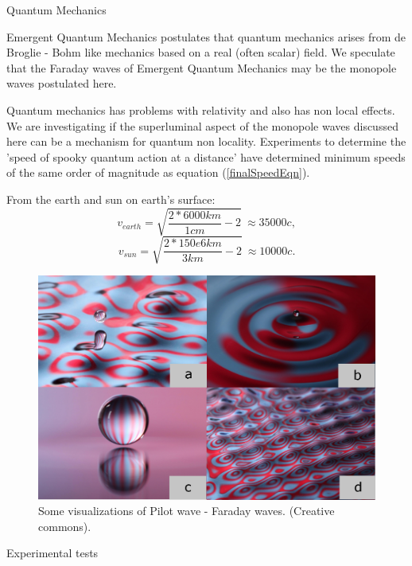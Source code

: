 \documentclass[final]{beamer}
\newlength{\colwidth}
\begin{document}
\begin{frame}[t]
\begin{columns}[t]
\begin{column}{\colwidth}
  \begin{block}{Quantum Mechanics}
  
  Emergent Quantum Mechanics postulates that quantum mechanics arises from de Broglie - Bohm like mechanics based on a real (often scalar) field\cite{Bush2015a}. We speculate that the Faraday waves of Emergent Quantum Mechanics may be the monopole waves postulated here. 
  
  Quantum mechanics has problems with relativity and also has non local effects. We are investigating if the superluminal aspect of the monopole waves discussed here can be a mechanism for quantum non locality. Experiments to determine the 'speed of spooky quantum action at a distance'\cite{salartTestingSpeedSpooky2008a} have determined minimum speeds of the same order of magnitude as equation (\ref{finalSpeedEqn}).
   
From the earth and sun on earth's surface:
  \begin{equation}
 v_{earth} = \sqrt{\frac{2*6000km}{1 cm} - 2} \ \approx 35000c ,
\end{equation}
\begin{equation}
 v_{sun} = \sqrt{\frac{2*150e6km}{3 km} - 2} \ \approx 10000c . 
\end{equation}

      \begin{figure}
\includegraphics[width=0.9\columnwidth]{bush-waves.png}
\caption{Some visualizations of Pilot wave - Faraday waves. (Creative commons). \cite{Bush2015a}}
\label{bush-faraday}
\end{figure} 

  
\begin{exampleblock}{Experimental tests}


\end{exampleblock}
\end{block}
\end{column}
\end{columns}
\end{frame}
\end{document}
